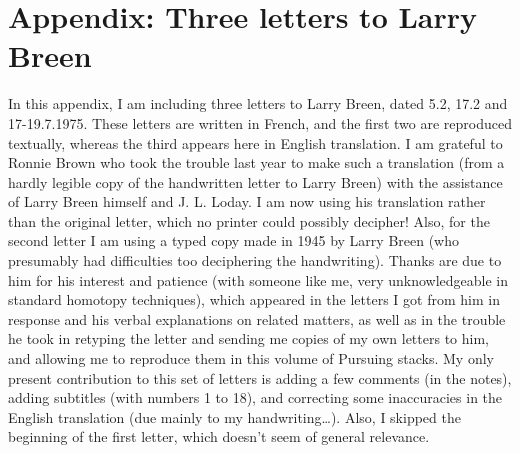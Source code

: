 
\chapter*{Appendix: Three letters to Larry Breen}
\label{ch:AppchI}

In this appendix, I am including three letters to Larry Breen, dated 5.2, 
17.2 and 17-19.7.1975. These letters are written in French, and the first 
two are reproduced textually, whereas the third appears here in English translation.
I am grateful to Ronnie Brown who took the trouble last year to make such a translation 
(from a hardly legible copy of the handwritten letter to Larry Breen) with the assistance of Larry Breen himself and J. L. Loday. I am now using his translation rather than the original letter, which no printer could possibly decipher!
Also, for the second letter I am using a typed copy made in 1945 by Larry Breen (who presumably had difficulties too deciphering the handwriting). Thanks are due to him for his interest and patience (with someone like me, very unknowledgeable in standard homotopy techniques), which appeared in the letters I got from him in response and his verbal explanations on related matters, as well as in the trouble he took in retyping the letter and sending me copies of my own letters to him, and allowing me to reproduce them in this volume of Pursuing stacks. My only present contribution to this set of letters is adding a few comments (in the notes), adding subtitles (with numbers 1 to 18), and correcting some inaccuracies in the English translation (due mainly to my handwriting\dots). 
Also, I skipped the beginning of the first letter, which doesn't seem of general relevance.

